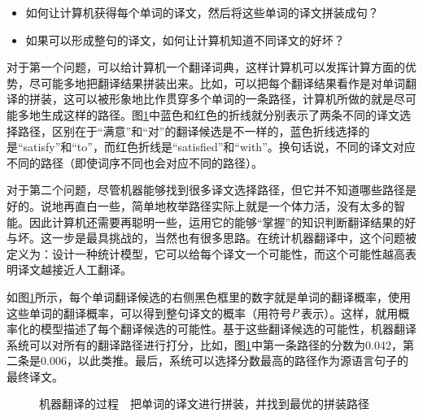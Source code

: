 \begin{itemize}
\vspace{0.5em}
\item 如何让计算机获得每个单词的译文，然后将这些单词的译文拼装成句？
\vspace{0.5em}
\item 如果可以形成整句的译文，如何让计算机知道不同译文的好坏？
\vspace{0.5em}
\end{itemize}

\parinterval 对于第一个问题，可以给计算机一个翻译词典，这样计算机可以发挥计算方面的优势，尽可能多地把翻译结果拼装出来。比如，可以把每个翻译结果看作是对单词翻译的拼装，这可以被形象地比作贯穿多个单词的一条路径，计算机所做的就是尽可能多地生成这样的路径。图\ref{fig:5-4}中蓝色和红色的折线就分别表示了两条不同的译文选择路径，区别在于“满意”和“对”的翻译候选是不一样的，蓝色折线选择的是“satisfy”和“to”，而红色折线是“satisfied”和“with”。换句话说，不同的译文对应不同的路径（即使词序不同也会对应不同的路径）。

\parinterval 对于第二个问题，尽管机器能够找到很多译文选择路径，但它并不知道哪些路径是好的。说地再直白一些，简单地枚举路径实际上就是一个体力活，没有太多的智能。因此计算机还需要再聪明一些，运用它的能够“掌握”的知识判断翻译结果的好与坏。这一步是最具挑战的，当然也有很多思路。在统计机器翻译中，这个问题被定义为：设计一种统计模型，它可以给每个译文一个可能性，而这个可能性越高表明译文越接近人工翻译。

\parinterval 如图\ref{fig:5-4}所示，每个单词翻译候选的右侧黑色框里的数字就是单词的翻译概率，使用这些单词的翻译概率，可以得到整句译文的概率（用符号${P}$表示）。这样，就用概率化的模型描述了每个翻译候选的可能性。基于这些翻译候选的可能性，机器翻译系统可以对所有的翻译路径进行打分，比如，图\ref{fig:5-4}中第一条路径的分数为0.042，第二条是0.006，以此类推。最后，系统可以选择分数最高的路径作为源语言句子的最终译文。

\begin{figure}[htp]
    \centering

    \caption{机器翻译的过程\ \dash \ 把单词的译文进行拼装，并找到最优的拼装路径}
    \label{fig:5-4}
\end{figure}


